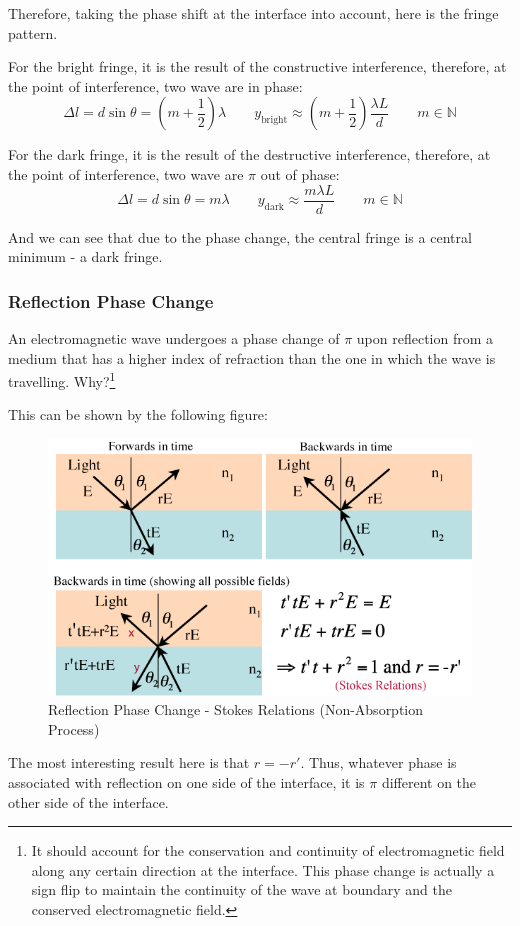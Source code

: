 \documentclass[UTF8]{book}
\begin{document}
Therefore, taking the phase shift at the interface into account, here is the fringe pattern.

For the bright fringe, it is the result of the constructive interference, therefore, at the point of interference, two wave are in phase:
\[\Delta l=d\sin \theta =\left(m+\frac{1}{2}\right)\lambda \qquad y_{\textrm{bright}}\approx \left(m+\frac{1}{2}\right)\frac{\lambda L}{d}\qquad m\in \mathbb{N}\]

For the dark fringe, it is the result of the destructive interference, therefore, at the point of interference, two wave are $\pi $ out of phase:
\[\Delta l=d\sin \theta =m\lambda \qquad y_{\textrm{dark}}\approx \frac{m\lambda L}{d}\qquad m\in \mathbb{N}\]

And we can see that due to the phase change, the central fringe is a central minimum - a dark fringe. 


\subsubsection{Reflection Phase Change}
An electromagnetic wave undergoes a phase change of $\pi$ upon reflection from a medium that has a higher index of refraction than the one in which the wave is travelling. Why?\footnote{It should account for the conservation and continuity of electromagnetic field along any certain direction at the interface. This phase change is actually a sign flip to maintain the continuity of the wave at boundary and the conserved electromagnetic field.}

This can be shown by the following figure:
\begin{figure}[H]
\centering
\includegraphics[scale=0.4]{Figure/20.PNG}
\caption{Reflection Phase Change - Stokes Relations (Non-Absorption Process)}
\label{fig:20}
\end{figure}
The most interesting result here is that $r=-r'$. Thus, whatever phase is associated with reflection on one side of the interface, it is $\pi$ different on the other side of the interface. 
\end{document}
